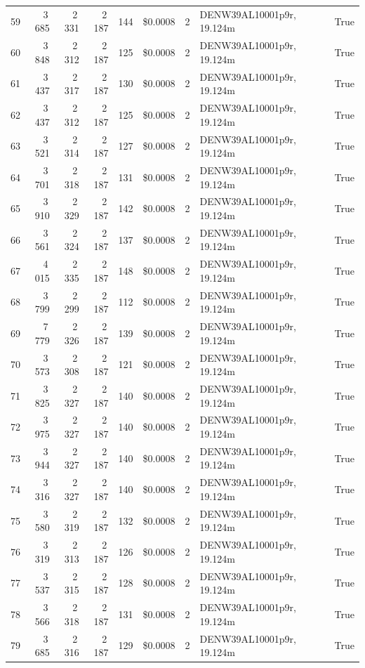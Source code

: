 \documentclass[a4paper,11pt]{article}
\begin{document}
\begin{table}[ht]
\begin{tabular}{r r r r r r r p{3cm} l}
59 & 3\,685 & 2\,331 & 2\,187 & 144 & \$0.0008 & 2 & DENW39AL10001p9r, 19.124m & True \\
60 & 3\,848 & 2\,312 & 2\,187 & 125 & \$0.0008 & 2 & DENW39AL10001p9r, 19.124m & True \\
61 & 3\,437 & 2\,317 & 2\,187 & 130 & \$0.0008 & 2 & DENW39AL10001p9r, 19.124m & True \\
62 & 3\,437 & 2\,312 & 2\,187 & 125 & \$0.0008 & 2 & DENW39AL10001p9r, 19.124m & True \\
63 & 3\,521 & 2\,314 & 2\,187 & 127 & \$0.0008 & 2 & DENW39AL10001p9r, 19.124m & True \\
64 & 3\,701 & 2\,318 & 2\,187 & 131 & \$0.0008 & 2 & DENW39AL10001p9r, 19.124m & True \\
65 & 3\,910 & 2\,329 & 2\,187 & 142 & \$0.0008 & 2 & DENW39AL10001p9r, 19.124m & True \\
66 & 3\,561 & 2\,324 & 2\,187 & 137 & \$0.0008 & 2 & DENW39AL10001p9r, 19.124m & True \\
67 & 4\,015 & 2\,335 & 2\,187 & 148 & \$0.0008 & 2 & DENW39AL10001p9r, 19.124m & True \\
68 & 3\,799 & 2\,299 & 2\,187 & 112 & \$0.0008 & 2 & DENW39AL10001p9r, 19.124m & True \\
69 & 7\,779 & 2\,326 & 2\,187 & 139 & \$0.0008 & 2 & DENW39AL10001p9r, 19.124m & True \\
70 & 3\,573 & 2\,308 & 2\,187 & 121 & \$0.0008 & 2 & DENW39AL10001p9r, 19.124m & True \\
71 & 3\,825 & 2\,327 & 2\,187 & 140 & \$0.0008 & 2 & DENW39AL10001p9r, 19.124m & True \\
72 & 3\,975 & 2\,327 & 2\,187 & 140 & \$0.0008 & 2 & DENW39AL10001p9r, 19.124m & True \\
73 & 3\,944 & 2\,327 & 2\,187 & 140 & \$0.0008 & 2 & DENW39AL10001p9r, 19.124m & True \\
74 & 3\,316 & 2\,327 & 2\,187 & 140 & \$0.0008 & 2 & DENW39AL10001p9r, 19.124m & True \\
75 & 3\,580 & 2\,319 & 2\,187 & 132 & \$0.0008 & 2 & DENW39AL10001p9r, 19.124m & True \\
76 & 3\,319 & 2\,313 & 2\,187 & 126 & \$0.0008 & 2 & DENW39AL10001p9r, 19.124m & True \\
77 & 3\,537 & 2\,315 & 2\,187 & 128 & \$0.0008 & 2 & DENW39AL10001p9r, 19.124m & True \\
78 & 3\,566 & 2\,318 & 2\,187 & 131 & \$0.0008 & 2 & DENW39AL10001p9r, 19.124m & True \\
79 & 3\,685 & 2\,316 & 2\,187 & 129 & \$0.0008 & 2 & DENW39AL10001p9r, 19.124m & True \\

\end{tabular}
\end{table}
\end{document}

